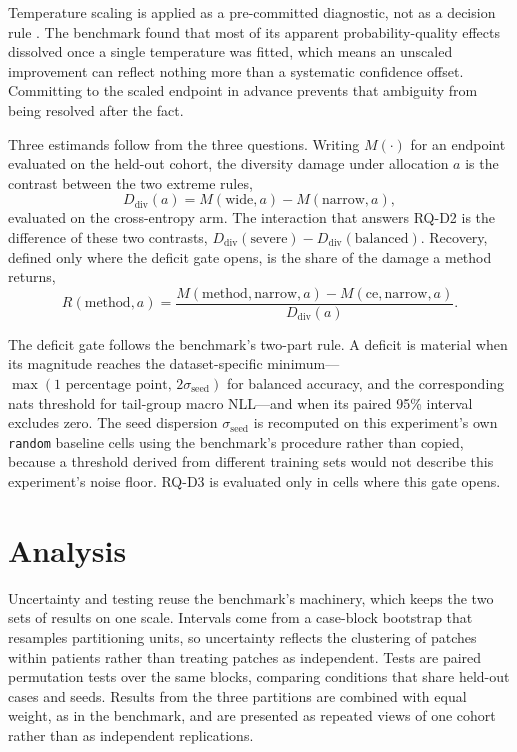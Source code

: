 \documentclass[11pt]{article}
\begin{document}
Temperature scaling is applied as a pre-committed diagnostic, not as a decision rule \citep{guo2017calibration}. The benchmark found that most of its apparent probability-quality effects dissolved once a single temperature was fitted, which means an unscaled improvement can reflect nothing more than a systematic confidence offset. Committing to the scaled endpoint in advance prevents that ambiguity from being resolved after the fact.

Three estimands follow from the three questions. Writing $M(\cdot)$ for an endpoint evaluated on the held-out cohort, the diversity damage under allocation $a$ is the contrast between the two extreme rules,
\begin{equation}
  D_{\mathrm{div}}(a)=M(\text{wide},a)-M(\text{narrow},a),
  \label{eq:damage}
\end{equation}
\noindent evaluated on the cross-entropy arm. The interaction that answers RQ-D2 is the difference of these two contrasts, $D_{\mathrm{div}}(\text{severe})-D_{\mathrm{div}}(\text{balanced})$. Recovery, defined only where the deficit gate opens, is the share of the damage a method returns,
\begin{equation}
  R(\text{method},a)=\frac{M(\text{method},\text{narrow},a)-M(\text{ce},\text{narrow},a)}{D_{\mathrm{div}}(a)}.
  \label{eq:recovery}
\end{equation}

\noindent The deficit gate follows the benchmark's two-part rule. A deficit is material when its magnitude reaches the dataset-specific minimum---$\max(\num{1}\text{ percentage point},\,2\sigma_{\mathrm{seed}})$ for balanced accuracy, and the corresponding nats threshold for tail-group macro NLL---and when its paired \num{95}\% interval excludes zero. The seed dispersion $\sigma_{\mathrm{seed}}$ is recomputed on this experiment's own \texttt{random} baseline cells using the benchmark's procedure rather than copied, because a threshold derived from different training sets would not describe this experiment's noise floor. RQ-D3 is evaluated only in cells where this gate opens.

\section{Analysis}
\label{sec:analysis}
Uncertainty and testing reuse the benchmark's machinery, which keeps the two sets of results on one scale. Intervals come from a case-block bootstrap that resamples partitioning units, so uncertainty reflects the clustering of patches within patients rather than treating patches as independent. Tests are paired permutation tests over the same blocks, comparing conditions that share held-out cases and seeds. Results from the three partitions are combined with equal weight, as in the benchmark, and are presented as repeated views of one cohort rather than as independent replications.
\end{document}
